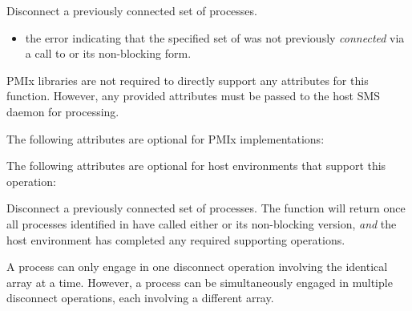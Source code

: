 \summary

Disconnect a previously connected set of processes.

\format


\begin{arglist}
\end{arglist}

\returnstart
\begin{itemize}
    \item the  error indicating that the specified set of  was not previously \textit{connected} via a call to  or its non-blocking form.
\end{itemize}
\returnend

\reqattrstart
\ac{PMIx} libraries are not required to directly support any attributes for this function. However, any provided attributes must be passed to the host \ac{SMS} daemon for processing.

\reqattrend

\optattrstart
The following attributes are optional for \ac{PMIx} implementations:



The following attributes are optional for host environments that support this operation:


\optattrend

\descr

Disconnect a previously connected set of processes. The function will return once all processes identified in  have called either  or its non-blocking version, \textit{and} the host environment has completed any required supporting operations.

A process can only engage in one disconnect operation involving the identical  array at a time.
However, a process can be simultaneously engaged in multiple disconnect operations, each involving a different  array.


